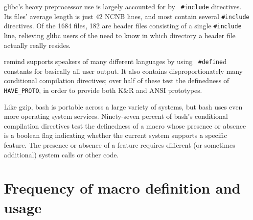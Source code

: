 \documentclass[11pt]{article}
\newcommand{\pkg}[1]{\textsf{#1}}
\begin{document}
\pkg{glibc}'s heavy preprocessor use is largely accounted for by {\tt
  \#include} directives.  Its files' average length is just 42 NCNB
lines, and most contain several {\tt \#include} directives.  Of the
1684 files, 182 are header files consisting of a single {\tt \#include}
line, relieving \pkg{glibc} users of the need to know in which directory
a header file actually really resides.

\pkg{remind} supports speakers of many different languages by using {\tt
\#define}d constants for basically all user output.  It also contains
disproportionately many conditional compilation directives; over half of
these test the definedness of \verb|HAVE_PROTO|, in order to provide both
K\&R and ANSI prototypes.

Like \pkg{gzip}, \pkg{bash} is portable across a large variety of
systems, but \pkg{bash} uses even more operating system services.
Ninety-seven percent of \pkg{bash}'s conditional compilation directives
test the definedness of a macro whose presence or absence is a boolean
flag indicating whether the current system supports a specific feature.
The presence or absence of a feature requires different (or sometimes
additional) system calls or other code.


\section{Frequency of macro definition and usage}
\label{sec:usage}


%
%

\end{document}
